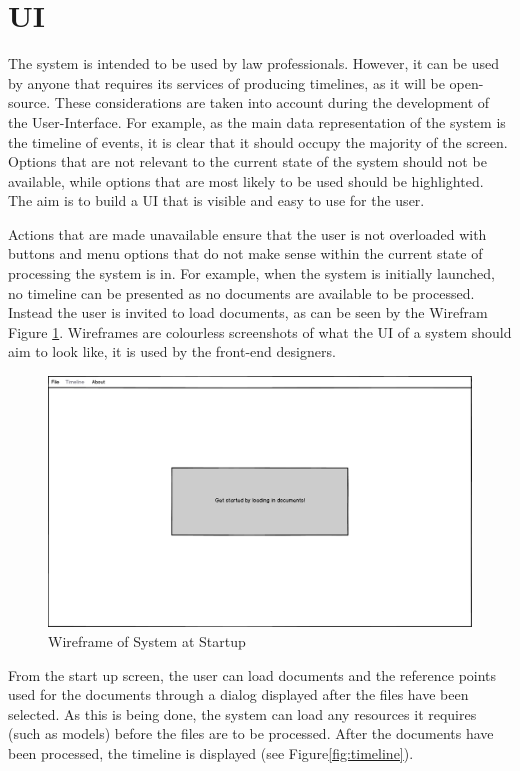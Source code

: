 \section{UI}
\par The system is intended to be used by law professionals. However, it can be used by anyone that requires its services of producing timelines, as it will be open-source.  These considerations are taken into account during the development of the User-Interface. For example, as the main data representation of the system is the timeline of events, it is clear that it should occupy the majority of the screen. Options that are not relevant to the current state of the system should not be available, while options that are most likely to be used should be highlighted. The aim is to build a UI that is visible and easy to use for the user.
\par Actions that are made unavailable ensure that the user is not overloaded with buttons and menu options that do not make sense within the current state of processing the system is in. For example, when the system is initially launched, no timeline can be presented as no documents are available to be processed. Instead the user is invited to load documents, as can be seen by the Wirefram Figure \ref{fig:startup}. Wireframes are colourless screenshots of what the UI of a system should aim to look like, it is used by the front-end designers.
\begin{figure}[h]
\caption{Wireframe of System at Startup}
\label{fig:startup}
\includegraphics[width=\linewidth]{startup.png}
\centering
\end{figure}
\par From the start up screen, the user can load documents and the reference points used for the documents through a dialog displayed after the files have been selected. As this is being done, the system can load any resources it requires (such as models) before the files are to be processed. After the documents have been processed, the timeline is displayed (see Figure\ref{fig:timeline}).
